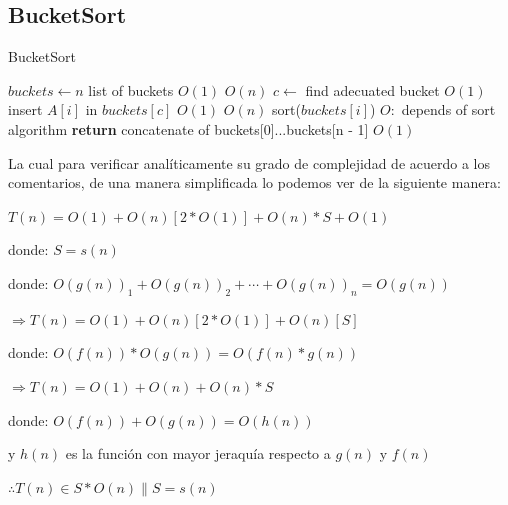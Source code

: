 \documentclass[12pt,twoside]{article}
\begin{document}
\subsection{\textbf{BucketSort}}
\begin{algorithm}
  \caption{BucketSort}\label{euclid}
  \begin{algorithmic}[1]
      \State $buckets \gets n$ list of buckets                          \Comment $O(1)$
                                    \Comment $O(n)$
        \State $c \gets$ find adecuated bucket                          \Comment $O(1)$
        \State insert $A[i]$ in $buckets[c]$                            \Comment $O(1)$
      \EndFor
                                           \Comment $O(n)$
        \State sort($buckets[i]$)                                       \Comment $O:$ depends of sort algorithm
      \EndFor
      \State \textbf{return} concatenate of buckets[0]...buckets[n - 1] \Comment $O(1)$
  \EndFunction
  \end{algorithmic}
\end{algorithm}

La cual para verificar analíticamente su grado de complejidad de acuerdo a los comentarios, de una manera simplificada lo podemos ver de la siguiente
manera: 

\centerline{$T(n) = O(1)+O(n)[2*O(1)]+O(n)*S+O(1)$}
\centerline{}
\centerline{donde: $S = s(n)$}
\centerline{}
\centerline{donde: $O(g(n))_{1} + O(g(n))_{2}+\cdots+O(g(n))_n = O(g(n))$}
\centerline{}
\centerline{$\Rightarrow T(n) = O(1)+O(n)[2*O(1)]+O(n)[S]$}
\centerline{}
\centerline{donde: $O(f(n)) * O(g(n))= O(f(n)*g(n))$}
\centerline{}
\centerline{$\Rightarrow T(n) = O(1) + O(n) + O(n)*S$}
\centerline{}
\centerline{donde: $O(f(n)) + O(g(n)) = O(h(n))$}
\centerline{y $h(n)$ es la funci\'on con mayor jeraqu\'ia respecto a $g(n)$ y $f(n)$}
\centerline{}
\centerline{$\therefore T(n) \in S*O(n) \| S = s(n) $}
\end{document}
